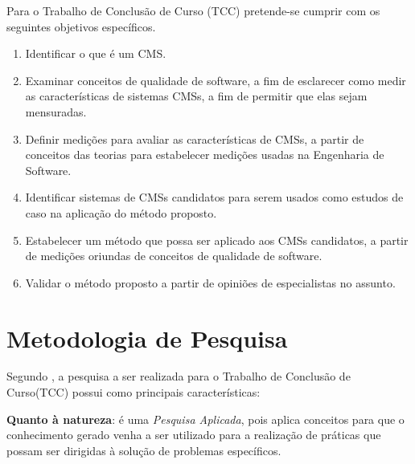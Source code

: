 \label{objEspp2}
Para o Trabalho de Conclusão de Curso (TCC) pretende-se cumprir com os seguintes objetivos específicos.
\begin{enumerate}

\item Identificar o que é um CMS.



\item	Examinar conceitos de qualidade de software, a fim de esclarecer como medir as características de sistemas CMSs, a fim de permitir que elas sejam mensuradas.

\item Definir medições para avaliar as características de CMSs, a partir de  conceitos das teorias para estabelecer medições usadas na Engenharia de Software. 	


\item Identificar sistemas de CMSs candidatos para serem usados como estudos de caso na aplicação do método proposto. 

\item Estabelecer um método que possa ser aplicado aos CMSs candidatos, a partir de medições oriundas de conceitos de qualidade de software.

\item Validar o método proposto a partir de opiniões de especialistas no assunto. 

\end{enumerate}

\section{Metodologia de Pesquisa}
\label{Metodologia}

Segundo , a pesquisa a ser realizada para o Trabalho de Conclusão de Curso(TCC)  possui como principais características:

\textbf{Quanto à natureza}: é uma \textit{Pesquisa Aplicada}, pois aplica conceitos para que o conhecimento gerado venha a ser utilizado para a realização de práticas que possam ser dirigidas à solução de problemas específicos.

